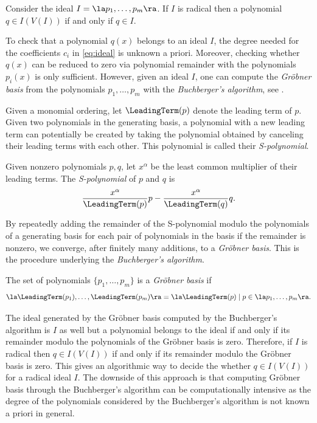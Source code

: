 \documentclass[11pt,twoside,a4paper,openright]{uclouvain-thesis}
\begin{document}
\begin{mycoro}
  Consider the ideal $I = \la p_1, \ldots, p_m \ra$.
  If $I$ is radical then a polynomial $q \in I(V(I))$ if and only if $q \in I$.
\end{mycoro}

To check that a polynomial $q(x)$ belongs to an ideal $I$, the degree needed for the
coefficients $c_i$ in \eqref{eq:ideal} is unknown a priori.
Moreover, checking whether $q(x)$ can be reduced to zero via polynomial
remainder with the polynomials $p_i(x)$ is only sufficient.
However, given an ideal $I$, one can compute the \emph{Gr\"{o}bner basis}
from the polynomials $p_1, \ldots, p_m$ with the \emph{Buchberger's algorithm}, see \cite[Section~2.7]{cox2015groebner}.


Given a monomial ordering, let $\LeadingTerm(p)$ denote the leading term of $p$.
Given two polynomials in the generating basis,
a polynomial with a new leading term can potentially be created by
taking the polynomial obtained by canceling their leading terms with each other.
This polynomial is called their \emph{S-polynomial}.

\begin{mydef}
  Given nonzero polynomials $p, q$, let $x^\alpha$
  be the least common multiplier of their leading terms.
  The \emph{S-polynomial} of $p$ and $q$ is
  \[ \frac{x^\alpha}{\LeadingTerm(p)} p - \frac{x^\alpha}{\LeadingTerm(q)} q. \]
\end{mydef}

By repeatedly adding the remainder of the S-polynomial modulo the polynomials of a generating basis
for each pair of polynomials in the basis if the remainder is nonzero,
we converge, after finitely many additions, to a \emph{Gr\"{o}bner basis}.
This is the procedure underlying the \emph{Buchberger's algorithm}.

\begin{mydef}
  The set of polynomials $\{p_1, \ldots, p_m\}$ is a \emph{Gr\"{o}bner basis}
  if
  \begin{equation}
    \label{eq:groebner}
   \la \LeadingTerm(p_1), \ldots, \LeadingTerm(p_m) \ra = \la \LeadingTerm(p) \mid p \in \la p_1, \ldots, p_m \ra.
  \end{equation}
\end{mydef}

The ideal generated by the Gr\"{o}bner basis computed by the Buchberger's algorithm is $I$ as well but
a polynomial belongs to the ideal if and only if its remainder modulo the polynomials
of the Gr\"{o}bner basis is zero.
Therefore, if $I$ is radical then $q \in I(V(I))$ if and only if its remainder modulo
the Gr\"{o}bner basis is zero.
This gives an algorithmic way to decide the whether $q \in I(V(I))$
for a radical ideal $I$.
The downside of this approach is that computing Gr\"{o}bner basis through the
Buchberger's algorithm can be computationally intensive as the degree of the polynomials
considered by the Buchberger's algorithm is not known a priori in general.
\end{document}
